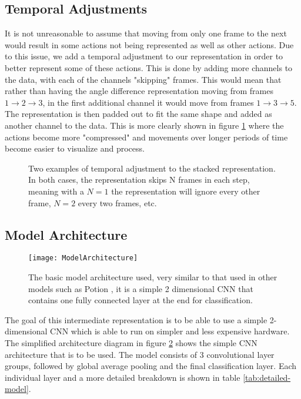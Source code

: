 \subsection{Temporal Adjustments}

It is not unreasonable to assume that moving from only one frame to the next would result in some actions not being represented as well as other actions. Due to this issue, we add a temporal adjustment to our representation in order to better represent some of these actions. This is done by adding more channels to the data, with each of the channels "skipping" frames. This would mean that rather than having the angle difference representation moving from frames $1 \rightarrow 2 \rightarrow 3$, in the first additional channel it would move from frames $1 \rightarrow 3 \rightarrow 5$. The representation is then padded out to fit the same shape and added as another channel to the data. This is more clearly shown in figure \ref{fig:intermediate-stacked-skip} where the actions become more "compressed" and movements over longer periods of time become easier to visualize and process.

\begin{figure}[ht]
	\centering
	\caption{Two examples of temporal adjustment to the stacked representation. In both cases, the representation skips N frames in each step, meaning with a $N = 1$ the representation will ignore every other frame, $N = 2$ every two frames, etc.}
	\label{fig:intermediate-stacked-skip}
\end{figure}

\subsection{Model Architecture}

\begin{figure}[ht]
	\texttt{[image: ModelArchitecture]}
	\centering
	\caption{The basic model architecture used, very similar to that used in other models such as Potion \cite{potion}, it is a simple 2 dimensional CNN that contains one fully connected layer at the end for classification.}
	\label{fig:model-architecture}
\end{figure}

The goal of this intermediate representation is to be able to use a simple 2-dimensional CNN which is able to run on simpler and less expensive hardware. The simplified architecture diagram in figure \ref{fig:model-architecture} shows the simple CNN architecture that is to be used. The model consists of 3 convolutional layer groups, followed by global average pooling and the final classification layer. Each individual layer and a more detailed breakdown is shown in table \ref{tab:detailed-model}. 

